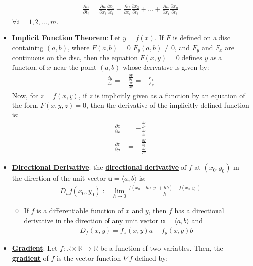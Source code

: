 \documentclass[reqno,11pt]{amsart}
\theoremstyle{definition}
\theoremstyle{remark}
\newcommand{\R}{\mathbb{R}}
\newcommand{\dfn}[1]{\underline{\textbf{#1}}}
\begin{document}
\begin{itemize}[noitemsep]
	\begin{align}
		\frac{\partial u}{\partial t_i} = \frac{\partial u}{\partial x_i} \frac{\partial x_1}{\partial t_i}	+ \frac{\partial u}{\partial x_i} \frac{\partial x_2}{\partial t_i} + ... + \frac{\partial u}{\partial x_i} \frac{\partial x_n}{\partial t_i}
	\end{align}
	$\forall i = 1, 2, ..., m$. 
	\item \dfn{Implicit Function Theorem}: Let $y=f(x)$. If $F$ is defined on a disc containing $(a,b)$, where $F(a,b) = 0$ $F_y(a,b) \neq 0$, and $F_y$ and $F_x$ are continuous on the disc, then the equation $F(x,y) = 0$ defines $y$ as a function of $x$ near the point $(a,b)$ whose derivative is given by: 
	\begin{align}
		\frac{dy}{dx} = - \frac{\frac{\partial F}{\partial x}}{\frac{\partial F}{\partial y}} = - \frac{F_x}{F_y}	
	\end{align}
	Now, for $z=f(x,y)$, if $z$ is implicitly given as a function by an equation of the form $F(x,y,z) =0$, then the derivative of the implicitly defined function is: 
	\begin{align}
		\frac{\partial z}{\partial x} & = - \frac{\frac{\partial F}{\partial x}}{\frac{\partial F}{\partial z}}	\\
		\frac{\partial z}{\partial y} & = - \frac{\frac{\partial F}{\partial y}}{\frac{\partial F}{\partial z}}
	\end{align}
	\item \dfn{Directional Derivative}: the \dfn{directional derivative} of $f$ at $(x_0, y_0)$ in the direction of the unit vector $\mathbf{u} = \langle a, b \rangle$ is:
	\begin{align}
		D_uf(x_0, y_0) := \lim_{h \rightarrow 0 } \frac{f(x_0 + ha, y_0 + hb) - f(x_0, y_0)}{h}	
	\end{align}
	\begin{itemize}[noitemsep]
		\item If $f$ is a differentiable function of $x$ and $y$, then $f$ has a directional derivative in the direction of any unit vector $\mathbf{u} = \langle a, b \rangle$ and 
		\begin{align}	
			D_f(x,y) = f_x(x,y) a + f_y(x,y) b 	
		\end{align}
	\end{itemize}
	\item \dfn{Gradient}: Let $f: \R \times \R \rightarrow \R$ be a function of two variables. Then, the \dfn{gradient} of $f$ is the vector function $\nabla f$ defined by: 
	\begin{align*}

\end{align*}
\end{itemize}
\end{document}
